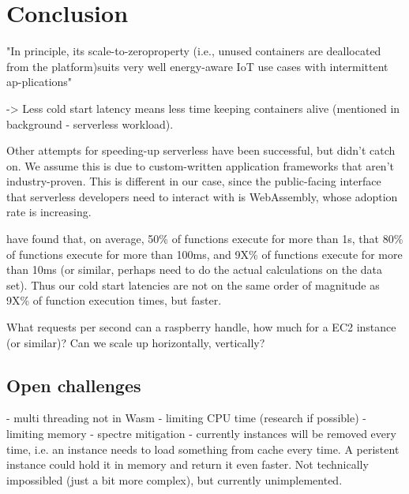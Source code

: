 \chapter{Conclusion}
\label{chapter:conclusion}

"In principle, its scale-to-zeroproperty (i.e., unused containers are deallocated from the platform)suits very well energy-aware IoT use cases with intermittent ap-plications" \cite{Aslanpour2021}

-> Less cold start latency means less time keeping containers alive (mentioned in background - serverless workload).

Other attempts for speeding-up serverless have been successful, but didn't catch on. We assume this is due to custom-written application frameworks that aren't industry-proven. This is different in our case, since the public-facing interface that serverless developers need to interact with is WebAssembly, whose adoption rate is increasing.

\citeauthor{Shahrad2020} have found that, on average, 50\% of functions execute for more than 1s, that 80\% of functions execute for more than 100ms, and 9X\% of functions execute for more than 10ms (or similar, perhaps need to do the actual calculations on the data set). Thus our cold start latencies are not on the same order of magnitude as 9X\% of function execution times, but faster.

What requests per second can a raspberry handle, how much for a EC2 instance (or similar)? Can we scale up horizontally, vertically?

\section{Open challenges}

- multi threading not in Wasm
- limiting CPU time (research if possible)
- limiting memory
- spectre mitigation
- currently instances will be removed every time, i.e. an instance needs to load something from cache every time. A peristent instance could hold it in memory and return it even faster. Not technically impossibled (just a bit more complex), but currently unimplemented.